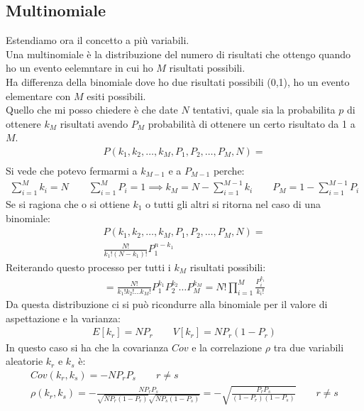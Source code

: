 \documentclass[a4paper, oneside]{article}
\begin{document}
\subsection{Multinomiale}
Estendiamo ora il concetto a più variabili.\\
Una multinomiale è la distribuzione del numero di risultati che ottengo quando ho un evento eelemntare in cui ho $M$ risultati possibili.\\
Ha differenza della binomiale dove ho due risultati possibili (0,1), ho un evento elementare con $M$ esiti possibili.\\
Quello che mi posso chiedere è che date $N$ tentativi, quale sia la probabilita $p$ di ottenere $k_M$ risultati avendo $P_M$ probabilità di ottenere un certo risultato da 1 a $M$.
\begin{gather*}
    P(k_1, k_2, \dots, k_M, P_1, P_2, \dots, P_M, N) =\\
\end{gather*}
Si vede che potevo fermarmi a $k_{M-1}$ e a $P_{M-1}$ perche:
\begin{gather*}
    \sum_{i=1}^{M} k_i = N \qquad \sum_{i=1}^{M} P_i = 1 \implies k_M = N - \sum_{i=1}^{M-1} k_i \qquad P_M = 1 - \sum_{i=1}^{M-1} P_i
\end{gather*}
Se si ragiona che o si ottiene $k_1$ o tutti gli altri si ritorna nel caso di una binomiale:
\begin{gather*}
    P(k_1, k_2, \dots, k_M, P_1, P_2, \dots, P_M, N) =\\
    \frac{N!}{k_1!(N-k_1)!} P_1^{n-k_1}
\end{gather*}
Reiterando questo processo per tutti i $k_M$ risultati possibili:
\begin{gather*}
    = \frac{N!}{k_1!k_2! \dots k_M!} P_1^{k_1} P_2^{k_2} \dots P_M^{k_M} = N! \prod_{i=1}^{M} \frac{P_i^{k_i}}{k_i!}
\end{gather*}
Da questa distribuzione ci si può ricondurre alla binomiale per il valore di aspettazione e la varianza:
\begin{gather*}
    E[k_r] = N P_r \qquad V[k_r] = N P_r (1-P_r)
\end{gather*}
In questo caso si ha che la covarianza $Cov$ e la correlazione $\rho$ tra due variabili aleatorie $k_r$ e $k_s$ è:
\begin{gather*}
    Cov(k_r, k_s) = -N P_r P_s \qquad r \neq s\\
    \rho(k_r,k_s) = -\frac{N P_r P_s}{\sqrt{N P_r(1-P_r)}\sqrt{N P_s(1-P_s)}} = -\sqrt{\frac{P_r P_s}{(1-P_r)(1-P_s)}} \qquad r \neq s
\end{gather*}
\end{document}
